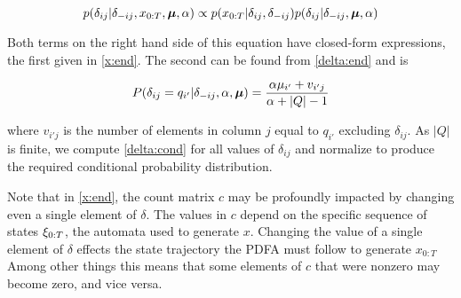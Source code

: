 \begin{equation}
p(\delta_{ij}|\delta_{-ij},x_{0:T},\bmu,\alpha) \propto p(x_{0:T}|\delta_{ij},\delta_{-ij})p(\delta_{ij}|\delta_{-ij},\bmu,\alpha) \label{delta:cond}
\end{equation}

Both terms on the right hand side of this equation have closed-form expressions, the first given in \eqref{x:end}.  The second can be found from \eqref{delta:end} and is

\begin{equation}
P(\delta_{ij} = q_{i'}|\delta_{-ij},\alpha,\bmu) = \frac{\alpha\mu_{i'} + v_{i'j}}{\alpha + |Q| - 1} \label{delta:pred}
\end{equation}

where $v_{i'j}$ is the number of elements in column $j$ equal to $q_{i'}$  excluding $\delta_{ij}$.  As $|Q|$ is finite, we compute \eqref{delta:cond} for all values of $\delta_{ij}$ and normalize to produce the required conditional probability distribution.

Note that in \eqref{x:end}, the count matrix $c$ may be profoundly impacted by changing even a single element of $\delta$.  The values in $c$ depend on the specific sequence of states  $\q_{0:T}$, the automata used to generate $x$.  Changing the value of a single element of $\delta$ effects the state trajectory the PDFA must follow to generate $x_{0:T}$  %
 Among other things this means that some elements of $c$ that were nonzero may become zero, and vice versa.

